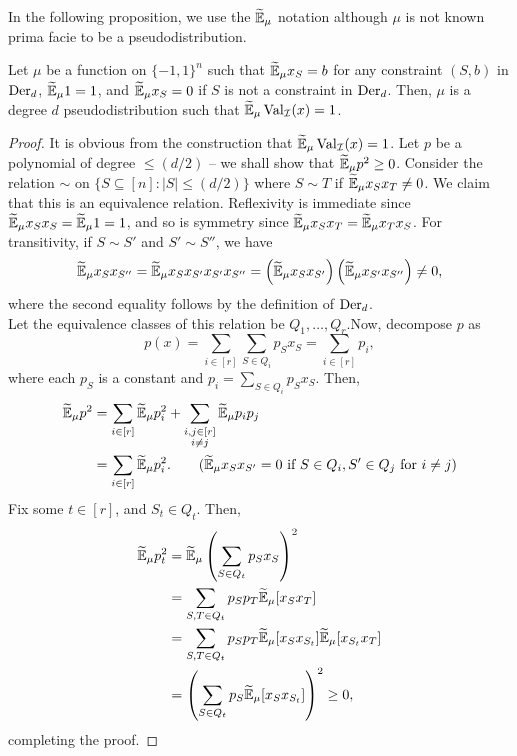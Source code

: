 	In the following proposition, we use the $\widetilde{\mathbb{E}}_\mu$ notation although $\mu$ is not known prima facie to be a pseudodistribution.
	\begin{fprop}
		Let $\mu$ be a function on $\{-1,1\}^n$ such that $\widetilde{\mathbb{E}}_\mu x_S = b$ for any constraint $(S,b)$ in $\operatorname{Der}_d$, $\widetilde{\mathbb{E}}_\mu 1 = 1$, and $\widetilde{\mathbb{E}}_\mu x_S = 0$ if $S$ is not a constraint in $\operatorname{Der}_d$. Then, $\mu$ is a degree $d$ pseudodistribution such that $\widetilde{\mathbb{E}}_\mu \operatorname{Val}_\mathcal{I}(x) = 1$.
	\end{fprop}
	\begin{proof}
		It is obvious from the construction that $\widetilde{\mathbb{E}}_\mu \operatorname{Val}_\mathcal{I}(x) = 1$. Let $p$ be a polynomial of degree $\le (d/2)$ -- we shall show that $\widetilde{\mathbb{E}}_\mu p^2 \ge 0$. Consider the relation $\sim$ on $\{S \subseteq [n] : |S| \le (d/2) \}$ where $S \sim T$ if $\widetilde{\mathbb{E}}_\mu x_S x_T \ne 0$. We claim that this is an equivalence relation. Reflexivity is immediate since $\widetilde{\mathbb{E}}_\mu x_S x_S = \widetilde{\mathbb{E}}_\mu 1 = 1$, and so is symmetry since $\widetilde{\mathbb{E}}_\mu x_S x_T = \widetilde{\mathbb{E}}_\mu x_T x_S$. For transitivity, if $S \sim S'$ and $S' \sim S''$, we have 
		\[ \widetilde{\mathbb{E}}_\mu x_S x_{S''} = \widetilde{\mathbb{E}}_\mu x_S x_{S'} x_{S'} x_{S''} = \left(\widetilde{\mathbb{E}}_\mu x_S x_{S'}\right) \left(\widetilde{\mathbb{E}}_\mu x_{S'} x_{S''}\right) \ne 0, \]
		where the second equality follows by the definition of $\operatorname{Der}_d$.\\ 
		Let the equivalence classes of this relation be $Q_1,\ldots,Q_r$.Now, decompose $p$ as
		\[ p(x) = \sum_{i \in [r]} \sum_{S \in Q_i} p_S x_S = \sum_{i \in [r]} p_i, \]
		where each $p_S$ is a constant and $p_i = \sum_{S \in Q_i} p_S x_S$. Then,
		\begin{align*}
			\widetilde{\mathbb{E}}_\mu p^2 &= \sum_{i \in [r]} \widetilde{\mathbb{E}}_\mu p_i^2 + \sum_{\substack{i,j \in [r] \\ i \ne j}} \widetilde{\mathbb{E}}_\mu  p_i p_j \\
				&= \sum_{i \in [r]} \widetilde{\mathbb{E}}_\mu p_i^2. \qquad \text{($\widetilde{\mathbb{E}}_\mu x_S x_{S'} = 0$ if $S \in Q_i, S' \in Q_j$ for $i \ne j$)}
		\end{align*}
		Fix some $t \in [r]$, and $S_t \in Q_t$. Then,
		\begin{align*}
			\widetilde{\mathbb{E}}_\mu p_t^2 &= \widetilde{\mathbb{E}}_\mu \left(\sum_{S \in Q_t} p_S x_S\right)^2 \\
				&= \sum_{S,T \in Q_t} p_S p_T \widetilde{\mathbb{E}}_\mu [x_S x_T] \\
				&= \sum_{S,T \in Q_t} p_S p_T \widetilde{\mathbb{E}}_\mu [x_S x_{S_t}] \widetilde{\mathbb{E}}_\mu [x_{S_t} x_T] \\
				&= \left(\sum_{S \in Q_t} p_S \widetilde{\mathbb{E}}_\mu [x_S x_{S_t}]\right)^2 \ge 0,
		\end{align*}
		completing the proof.
	\end{proof}

